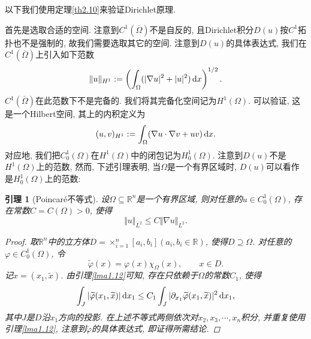\documentclass[12pt,a4paper]{article}
\newtheorem{lemma}[theorem]{引理}
\begin{document}
以下我们使用定理\ref{th2.10}来验证Dirichlet原理.

首先是选取合适的空间. 注意到$C^1(\overline{\Omega})$不是自反的, 且Dirichlet积分$D(u)$按$C^1$拓扑也不是强制的, 故我们需要选取其它的空间.
注意到$D(u)$的具体表达式, 我们在$C^1(\overline{\Omega})$上引入如下范数 
\begin{equation*}
    \Vert u \Vert_{H^1} := \left(\int_{\Omega}(|\nabla u|^2 + |u|^2) \,{\rm d}x\right)^{1/2}.
\end{equation*}
$C^1(\overline{\Omega})$在此范数下不是完备的. 我们将其完备化空间记为$H^1(\Omega)$.
可以验证, 这是一个Hilbert空间, 其上的内积定义为 
\begin{equation*}
    (u, v)_{H^1} := \int_{\Omega}(\nabla u \cdot \nabla v + uv) \,{\rm d}x. 
\end{equation*}
对应地, 我们把$C_0^1(\Omega)$在$H^1(\Omega)$中的闭包记为$H_0^1(\Omega)$. 注意到$D(u)$不是$H^1(\Omega)$上的范数, 然而, 下述引理表明, 当$\Omega$是一个有界区域时, $D(u)$可以看作是$H_0^1(\Omega)$上的范数:

\begin{lemma}[Poincaré不等式]
    设$\Omega \subseteq \mathbb{R}^n$是一个有界区域, 则对任意的$u \in C_0^1(\Omega)$, 存在常数$C = C(\Omega) > 0$, 使得 
    \begin{equation*}
        \Vert u \Vert_{L^2} \leq C\Vert \nabla u \Vert_{L^2}.
    \end{equation*}
    \begin{proof}
        取$\mathbb{R}^n$中的立方体$D = \times_{i = 1}^n[a_i, b_i] (a_i, b_i \in \mathbb{R})$, 使得$D \supseteq \Omega$. 对任意的$\varphi \in C_0^1(\Omega)$, 令 
        \begin{equation*}
            \widetilde{\varphi}(x) = \varphi(x)\chi_{\Omega}(x), \qquad x \in D.
        \end{equation*}
        记$x = (x_1, \widetilde{x})$. 由引理\ref{lma1.12}可知, 存在只依赖于$\Omega$的常数$C_1$, 使得
        \begin{equation*}
            \int_J |\widetilde{\varphi}(x_1, \widetilde{x})| \,{\rm d}x_1 \leq C_1\int_J|\partial_{x_1}\widetilde{\varphi}(x_1, \widetilde{x})|^2 \,{\rm d}x_1,
        \end{equation*}
        其中$J$是$D$沿$x_1$方向的投影. 在上述不等式两侧依次对$x_2, x_3, \cdots, x_n$积分, 并重复使用引理\ref{lma1.12}, 注意到$\widetilde{\varphi}$的具体表达式, 即证得所需结论.
    \end{proof}
\end{lemma}
\end{document}
